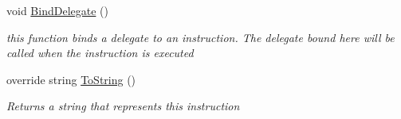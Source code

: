 \begin{DoxyCompactItemize}
void \hyperlink{class_c_p_u___o_s___simulator_1_1_c_p_u_1_1_instruction_ab3bbd51fd889e3bbeb656ea717a7fe9c}{Bind\+Delegate} ()
\begin{DoxyCompactList}\small\item\em this function binds a delegate to an instruction. The delegate bound here will be called when the instruction is executed \end{DoxyCompactList}\item 
override string \hyperlink{class_c_p_u___o_s___simulator_1_1_c_p_u_1_1_instruction_a7d3a81ead6e3639f970901d8e898f02c}{To\+String} ()
\begin{DoxyCompactList}\small\item\em Returns a string that represents this instruction \end{DoxyCompactList}\end{DoxyCompactItemize}
